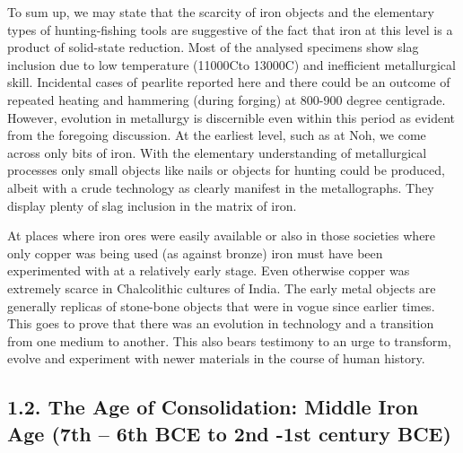 To sum up, we may state that the scarcity of iron objects and the elementary types of hunting-fishing tools are suggestive of the fact that iron at this level is a product of solid-state reduction. Most of the analysed specimens show slag inclusion due to low temperature (11000Cto 13000C) and inefficient metallurgical skill. Incidental cases of pearlite reported here and there could be an outcome of repeated heating and hammering (during forging) at 800-900 degree centigrade. However, evolution in metallurgy is discernible even within this period as evident from the foregoing discussion. At the earliest level, such as at Noh, we come across only bits of iron. With the elementary understanding of metallurgical processes only small objects like nails or objects for hunting could be produced, albeit with a crude technology as clearly manifest in the metallographs. They display plenty of slag inclusion in the matrix of iron.

At places where iron ores were easily available or also in those societies where only copper was being used (as against bronze) iron must have been experimented with at a relatively early stage. Even otherwise copper was extremely scarce in Chalcolithic cultures of India. The early metal objects are generally replicas of stone-bone objects that were in vogue since earlier times. This goes to prove that there was an evolution in technology and a transition from one medium to another. This also bears testimony to an urge to transform, evolve and experiment with newer materials in the course of human history.


\subsection*{1.2. The Age of Consolidation: Middle Iron Age (7th – 6th BCE to 2nd -1st century BCE)}

